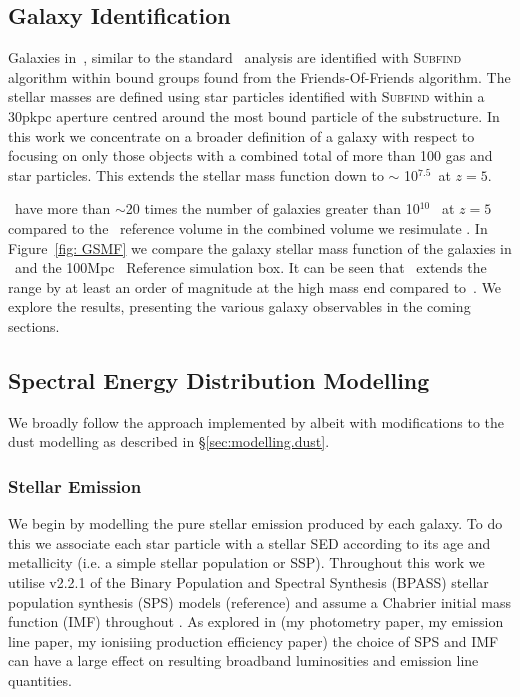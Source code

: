 \subsection{Galaxy Identification}\label{sim.galident}

Galaxies in \flares\,, similar to the standard \eagle\, analysis are identified with \textsc{Subfind} \citep{springel_populating_2001} algorithm within bound groups found from the Friends-Of-Friends \citep[FOF,][]{davis_evolution_1985} algorithm. The stellar masses are defined using star particles identified with \textsc{Subfind} within a 30pkpc aperture centred around the most bound particle of the substructure. In this work we concentrate on a broader definition of a galaxy with respect to  focusing on only those objects with a combined total of more than 100 gas and star particles. This extends the stellar mass function down to $\sim$ 10$^{7.5}$\Msun\, at $z=5$. 

\flares\, have more than $\sim$20 times the number of galaxies greater than 10$^{10}$ \Msun\ at $z=5$ compared to the \eagle\, reference volume \citep{schaye_eagle_2015} in the combined volume we resimulate . In Figure~\ref{fig: GSMF} we compare the galaxy stellar mass function of the galaxies in \flares\, and the 100Mpc \eagle\, Reference simulation box. It can be seen that \flares\, extends the range by at least an order of magnitude at the high mass end compared to \eagle\,. We explore the results, presenting the various galaxy observables in the coming sections.


\subsection{Spectral Energy Distribution Modelling}\label{sec:simulations.SED}

We broadly follow the approach implemented by \cite{Wilkins2016a,Wilkins2017,Wilkins2018,Wilkins2020} albeit with modifications to the dust modelling as described in \S\ref{sec:modelling.dust}.

\subsubsection{Stellar Emission}

We begin by modelling the pure stellar emission produced by each galaxy. To do this we associate each star particle with a stellar SED according to its age and metallicity (i.e. a simple stellar population or SSP). Throughout this work we utilise v2.2.1 of the Binary Population and Spectral Synthesis (BPASS) stellar population synthesis (SPS) models (reference) and assume a Chabrier initial mass function (IMF) throughout \citep{chabrier_galactic_2003}. As explored in (my photometry paper, my emission line paper, my ionisiing production efficiency paper) the choice of SPS and IMF can have a large effect on resulting broadband luminosities and emission line quantities.

